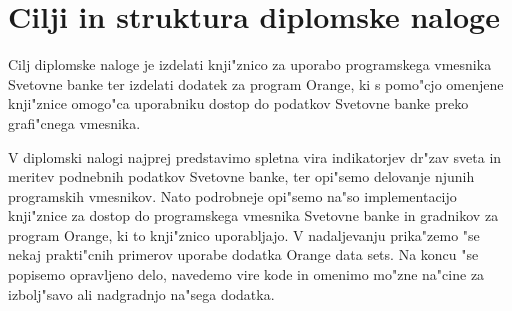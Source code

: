 \section{Cilji in struktura diplomske naloge}

Cilj diplomske naloge je izdelati knji"znico za uporabo programskega vmesnika
Svetovne banke ter izdelati dodatek za program Orange, ki s pomo"cjo omenjene
knji"znice omogo"ca uporabniku dostop do podatkov Svetovne banke preko
grafi"cnega vmesnika.

V diplomski nalogi najprej predstavimo spletna vira indikatorjev
dr"zav sveta in meritev podnebnih podatkov Svetovne banke, ter
opi"semo delovanje njunih programskih vmesnikov.
Nato podrobneje opi"semo na"so implementacijo knji"znice za dostop do
programskega vmesnika Svetovne banke in gradnikov za program Orange, ki to
knji"znico uporabljajo. V nadaljevanju prika"zemo "se nekaj prakti"cnih 
primerov uporabe dodatka Orange data sets. Na koncu "se popisemo opravljeno 
delo, navedemo vire kode in omenimo mo"zne na"cine za izbolj"savo ali 
nadgradnjo na"sega dodatka.















